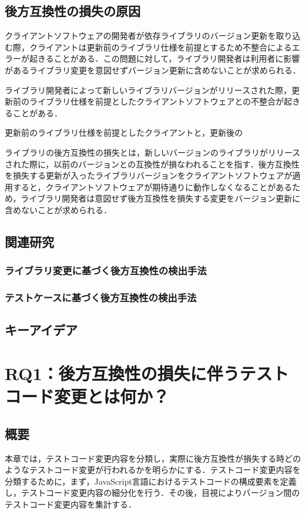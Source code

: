 \documentclass[11pt,dvipdfmx]{jreport}
\begin{document}
\section{後方互換性の損失の原因}
クライアントソフトウェアの開発者が依存ライブラリのバージョン更新を取り込む際，クライアントは更新前のライブラリ仕様を前提とするため不整合によるエラーが起きることがある．この問題に対して，ライブラリ開発者は利用者に影響があるライブラリ変更を意図せずバージョン更新に含めないことが求められる．

ライブラリ開発者によって新しいライブラリバージョンがリリースされた際，更新前のライブラリ仕様を前提としたクライアントソフトウェアとの不整合が起きることがある．

更新前のライブラリ仕様を前提としたクライアントと，更新後の


ライブラリの後方互換性の損失とは，新しいバージョンのライブラリがリリースされた際に，以前のバージョンとの互換性が損なわれることを指す．後方互換性を損失する更新が入ったライブラリバージョンをクライアントソフトウェアが適用すると，クライアントソフトウェアが期待通りに動作しなくなることがあるため，ライブラリ開発者は意図せず後方互換性を損失する変更をバージョン更新に含めないことが求められる．

\section{関連研究}

\subsection{ライブラリ変更に基づく後方互換性の検出手法}

\subsection{テストケースに基づく後方互換性の検出手法}

\section{キーアイデア}

\chapter{RQ1：後方互換性の損失に伴うテストコード変更とは何か？}\label{rq1}

\section{概要}
本章では，テストコード変更内容を分類し，実際に後方互換性が損失する時どのようなテストコード変更が行われるかを明らかにする．テストコード変更内容を分類するために，まず，JavaScript言語におけるテストコードの構成要素を定義し，テストコード変更内容の細分化を行う．その後，目視によりバージョン間のテストコード変更内容を集計する．
\end{document}
